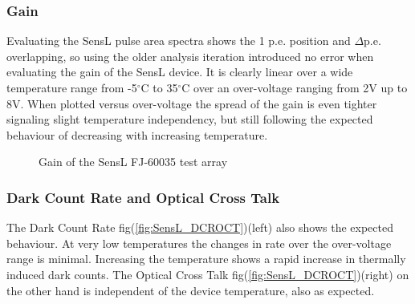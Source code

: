\documentclass[12pt,article,type=msc,colorback,accentcolor=tud9c]{tudthesis}
\begin{document}
\begin{figure}[h]
\begin{centering}
}
\caption{SensL Test Array and pulse shape at $V_{bias-voltage} = 29V$}
\label{fig:SensL_Array_PS}
\end{centering}
\end{figure}


\subsubsection{Gain}
\label{subsubsec:SensLGain}

Evaluating the SensL pulse area spectra shows the 1 p.e. position and $\Delta$p.e. overlapping, so using the older analysis iteration introduced no error when evaluating the gain of the SensL device. It is clearly linear over a wide temperature range from -5$^\circ$C to 35$^\circ$C over an over-voltage ranging from 2V up to 8V. When plotted versus over-voltage the spread of the gain is even tighter signaling slight temperature independency, but still following the expected behaviour of decreasing with increasing temperature.

\begin{figure}[h]
\begin{centering}
\caption{Gain of the SensL FJ-60035 test array}
\label{fig:SensL_Gain}
\end{centering}
\end{figure}


\subsubsection{Dark Count Rate and Optical Cross Talk}
\label{subsubsec:SensL_DCROCT}
The Dark Count Rate fig(\ref{fig:SensL_DCROCT})(left) also shows the expected behaviour. At very low temperatures the changes in rate over the over-voltage range is minimal. Increasing the temperature shows a rapid increase in thermally induced dark counts. The Optical Cross Talk fig(\ref{fig:SensL_DCROCT})(right) on the other hand is independent of the device temperature, also as expected. 
\end{document}
